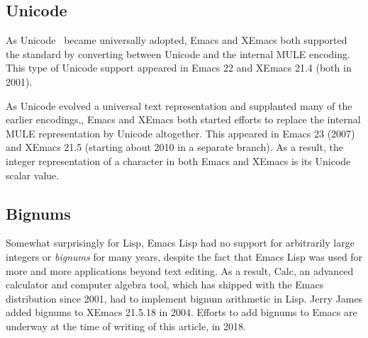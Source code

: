 \documentclass[format=acmsmall, review=false, screen=true]{acmart}
\begin{document}
\subsection{Unicode}

As Unicode~\cite{Unicode6} became universally adopted, Emacs
and XEmacs both supported the standard by converting between Unicode
and the internal MULE encoding.  This type of Unicode support appeared
in Emacs 22 and XEmacs 21.4 (both in 2001).

As Unicode evolved a universal text representation and supplanted many
of the earlier encodings,, Emacs and XEmacs both started efforts to
replace the internal MULE representation by Unicode altogether.  This
appeared in Emacs 23 (2007) and XEmacs 21.5 (starting about 2010 in a
separate branch).  As a result, the integer representation of a
character in both Emacs and XEmacs is its Unicode scalar value.

\subsection{Bignums}

Somewhat surprisingly for Lisp, Emacs Lisp had no support for
arbitrarily large integers or \textit{bignums} for many years, despite
the fact that Emacs Lisp was used for more and more applications
beyond text editing.  As a result, Calc, an advanced calculator and
computer algebra tool, which has shipped with the Emacs distribution
since 2001, had to implement bignum arithmetic in Lisp.  Jerry James
added bignums to XEmacs 21.5.18 in 2004.  Efforts to add bignums to
Emacs are underway at the time of writing of this article, in 2018.
\end{document}
